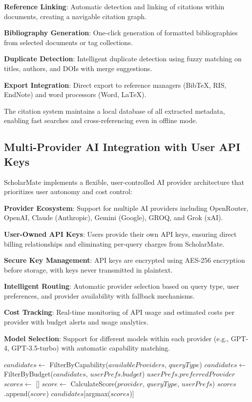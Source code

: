 \documentclass[conference]{IEEEtran}
\begin{document}
\textbf{Reference Linking}: Automatic detection and linking of citations within documents, creating a navigable citation graph.

\textbf{Bibliography Generation}: One-click generation of formatted bibliographies from selected documents or tag collections.

\textbf{Duplicate Detection}: Intelligent duplicate detection using fuzzy matching on titles, authors, and DOIs with merge suggestions.

\textbf{Export Integration}: Direct export to reference managers (BibTeX, RIS, EndNote) and word processors (Word, LaTeX).

The citation system maintains a local database of all extracted metadata, enabling fast searches and cross-referencing even in offline mode.

\subsection{Multi-Provider AI Integration with User API Keys}

ScholarMate implements a flexible, user-controlled AI provider architecture that prioritizes user autonomy and cost control:

\textbf{Provider Ecosystem}: Support for multiple AI providers including OpenRouter, OpenAI, Claude (Anthropic), Gemini (Google), GROQ, and Grok (xAI).

\textbf{User-Owned API Keys}: Users provide their own API keys, ensuring direct billing relationships and eliminating per-query charges from ScholarMate.

\textbf{Secure Key Management}: API keys are encrypted using AES-256 encryption before storage, with keys never transmitted in plaintext.

\textbf{Intelligent Routing}: Automatic provider selection based on query type, user preferences, and provider availability with fallback mechanisms.

\textbf{Cost Tracking}: Real-time monitoring of API usage and estimated costs per provider with budget alerts and usage analytics.

\textbf{Model Selection}: Support for different models within each provider (e.g., GPT-4, GPT-3.5-turbo) with automatic capability matching.

\begin{algorithm}[htbp]
\caption{AI Provider Selection Algorithm}
\begin{algorithmic}[1]
    \State $candidates \gets$ FilterByCapability($availableProviders$, $queryType$)
    \State $candidates \gets$ FilterByBudget($candidates$, $userPrefs.budget$)
        \State \Return $userPrefs.preferredProvider$
    \EndIf
    \State $scores \gets$ []
        \State $score \gets$ CalculateScore($provider$, $queryType$, $userPrefs$)
        \State $scores$.append($score$)
    \EndFor
    \State \Return $candidates$[argmax($scores$)]
\EndProcedure
\end{algorithmic}
\end{algorithm}
\end{document}
